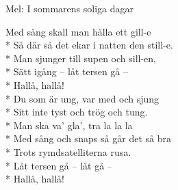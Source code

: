 \begin{SongText}
    \begin{SongInfo}
        Mel: I sommarens soliga dagar
    \end{SongInfo}
    \begin{SongVerse}
        Med sång skall man hålla ett gill-e\\*%
        Så där så det ekar i natten den still-e.\\*%
        Man sjunger till supen och sill-en,\\*%
        Sätt igång – låt tersen gå –\\*%
        Hallå, hallå!\\*%
        Du som är ung, var med och sjung\\*%
        Sitt inte tyst och trög och tung.\\*%
        Man ska va’ gla’, tra la la la\\*%
        Med sång och snaps så går det så bra\\*%
        Trots rymdsatelliterna rusa.\\*%
        Låt tersen gå – låt gå –\\*%
        Hallå, hallå!
    \end{SongVerse}
\end{SongText}
